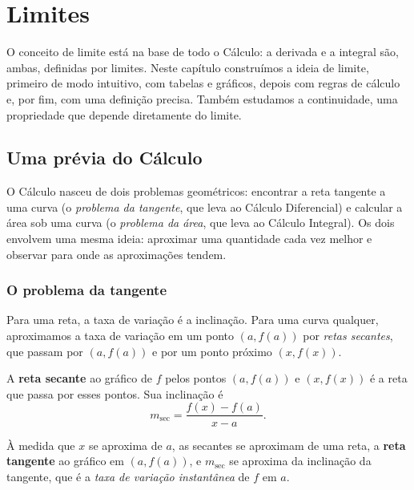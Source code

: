 \chapter{Limites}

O conceito de limite está na base de todo o Cálculo: a derivada e a integral são, ambas,
definidas por limites. Neste capítulo construímos a ideia de limite, primeiro de modo
intuitivo, com tabelas e gráficos, depois com regras de cálculo e, por fim, com uma
definição precisa. Também estudamos a continuidade, uma propriedade que depende
diretamente do limite.

\section{Uma prévia do Cálculo}

O Cálculo nasceu de dois problemas geométricos: encontrar a reta tangente a uma curva
(o \emph{problema da tangente}, que leva ao Cálculo Diferencial) e calcular a área sob uma
curva (o \emph{problema da área}, que leva ao Cálculo Integral). Os dois envolvem uma
mesma ideia: aproximar uma quantidade cada vez melhor e observar para onde as aproximações
tendem.

\subsection{O problema da tangente}

Para uma reta, a taxa de variação é a inclinação. Para uma curva qualquer, aproximamos a
taxa de variação em um ponto $(a,f(a))$ por \emph{retas secantes}, que passam por
$(a,f(a))$ e por um ponto próximo $(x,f(x))$.

\begin{definicao}
A \textbf{reta secante} ao gráfico de $f$ pelos pontos $(a,f(a))$ e $(x,f(x))$ é a reta
que passa por esses pontos. Sua inclinação é
\[
m_{\sec}=\frac{f(x)-f(a)}{x-a}.
\]
\end{definicao}

À medida que $x$ se aproxima de $a$, as secantes se aproximam de uma reta, a
\textbf{reta tangente} ao gráfico em $(a,f(a))$, e $m_{\sec}$ se aproxima da inclinação
da tangente, que é a \emph{taxa de variação instantânea} de $f$ em $a$.


